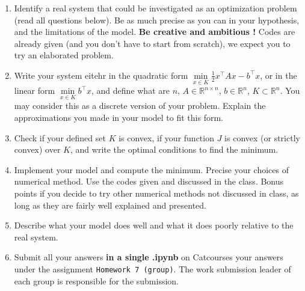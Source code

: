 \documentclass[11pt]{article}
\begin{document}
\begin{enumerate}
\item Identify a real system that could be investigated as an optimization problem (read all questions below). Be as much precise as you can in your hypothesis, and the limitations of the model. \textbf{Be creative and ambitious !} Codes are already given (and you don't have to start from scratch), we expect you to try an elaborated problem. 
 
\item Write your system eitehr in the quadratic form $ \min \limits_{x \in K} \frac{1}{2}x^\intercal A x - b^\intercal x$, or in the linear form $ \min \limits_{x \in K} b^\intercal x$, and define what are $n$, $A\in \mathbb{R}^{n\times n}$, $b \in \mathbb{R}^n$, $K \subset \mathbb{R}^n$. You may consider this as a discrete version of your problem. Explain the approximations you made in your model to fit this form.

\item Check if your defined set $K$ is convex, if your function $J$ is convex (or strictly convex) over $K$, and write the optimal conditions to find the minimum. 

\item Implement your model and compute the minimum. Precise your choices of numerical method. Use the codes given and discussed in the class. Bonus points if you decide to try other numerical methods not discussed in class, as long as they are fairly well explained and presented. 

\item Describe what your model does well and what it does poorly relative to the real system. 

\item Submit all your answers \textbf{in a single .ipynb} on Catcourses your answers under the assignment \texttt{Homework 7 (group)}. The work submission leader of each group is responsible for the submission.
\end{enumerate}
\end{document}
